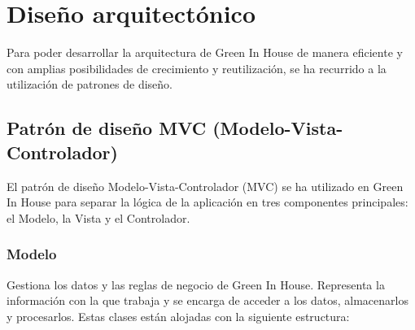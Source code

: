 \section{Diseño arquitectónico}
Para poder desarrollar la arquitectura de Green In House de manera eficiente y con amplias posibilidades de crecimiento y reutilización, se ha recurrido a la utilización de patrones de diseño. 

    \subsection{Patrón de diseño MVC (Modelo-Vista-Controlador)}
    El patrón de diseño Modelo-Vista-Controlador (MVC) se ha utilizado en Green In House para separar la lógica de la aplicación en tres componentes principales: el Modelo, la Vista y el Controlador. 
        \subsubsection{Modelo} 
        Gestiona los datos y las reglas de negocio de Green In House. Representa la información con la que trabaja y se encarga de acceder a los datos, almacenarlos y procesarlos. Estas clases están alojadas con la siguiente estructura:
